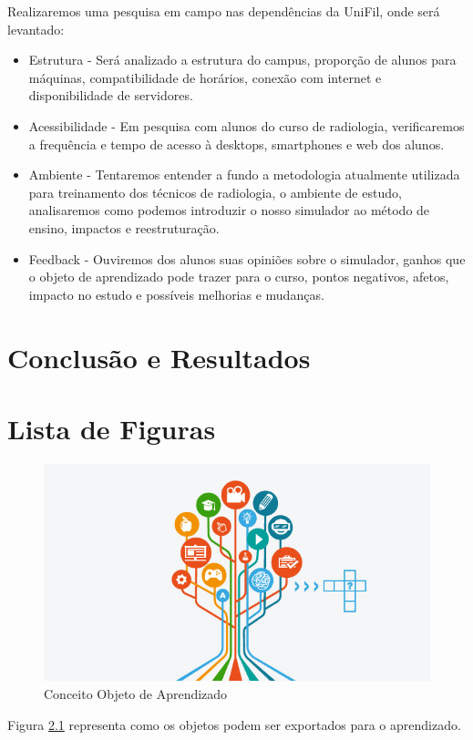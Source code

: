 \documentclass[12pt,openright,oneside,a4paper,english,french,spanish,brazil]{unifil}
\begin{document}
Realizaremos uma pesquisa em campo nas dependências da UniFil, onde será levantado:
\begin{itemize}
\item Estrutura - Será analizado a estrutura do campus, proporção de alunos para máquinas, compatibilidade de horários, conexão com internet e disponibilidade de servidores.
\item Acessibilidade - Em pesquisa com alunos do curso de radiologia, verificaremos a frequência e tempo de acesso à desktops, smartphones e web dos alunos.
\item Ambiente - Tentaremos entender a fundo a metodologia atualmente utilizada para treinamento dos técnicos de radiologia, o ambiente de estudo, analisaremos como podemos introduzir o nosso simulador ao método de ensino, impactos e reestruturação.
\item Feedback - Ouviremos dos alunos suas opiniões sobre o simulador, ganhos que o objeto de aprendizado pode trazer para o curso, pontos negativos, afetos, impacto no estudo e possíveis melhorias e mudanças.
\end{itemize}


\chapter {Conclusão e Resultados}

\chapter{Lista de Figuras}

\begin{figure}[htb]
	\centering
	\includegraphics[scale=0.5]{images/arvore.png}
	\caption{Conceito Objeto de Aprendizado}
	\label{img:arvore}
\end{figure}
Figura \ref{img:arvore} representa como os objetos podem ser exportados para o aprendizado.
\end{document}
